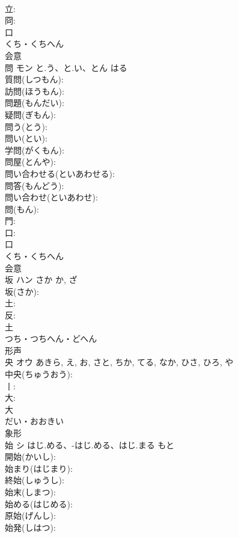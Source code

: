 \documentclass[8pt]{extreport}
\begin{document}
\begin{CJK}{UTF8}{min}
\\	立: 
\\	冏: 
\\	口	
\\	くち・くちへん	
\\	会意 
\\	問	モン	と.う、と.い、とん	はる	
\\	質問(しつもん): 
\\	訪問(ほうもん): 
\\	問題(もんだい): 
\\	疑問(ぎもん): 
\\	問う(とう): 
\\	問い(とい): 
\\	学問(がくもん): 
\\	問屋(とんや): 
\\	問い合わせる(といあわせる): 
\\	問答(もんどう): 
\\	問い合わせ(といあわせ): 
\\	問(もん): 
\\	門: 
\\	口: 
\\	口	
\\	くち・くちへん	
\\	会意 
\\	坂	ハン	さか	か, ざ	
\\	坂(さか): 
\\	土: 
\\	反: 
\\	土	
\\	つち・つちへん・どへん	
\\	形声 
\\	央	オウ		あきら, え, お, さと, ちか, てる, なか, ひさ, ひろ, や	
\\	中央(ちゅうおう): 
\\	丨: 
\\	大: 
\\	大	
\\	だい・おおきい	
\\	象形 
\\	始	シ	はじ.める、-はじ.める、はじ.まる	もと	
\\	開始(かいし): 
\\	始まり(はじまり): 
\\	終始(しゅうし): 
\\	始末(しまつ): 
\\	始める(はじめる): 
\\	原始(げんし): 
\\	始発(しはつ): 

\end{CJK}
\end{document}
